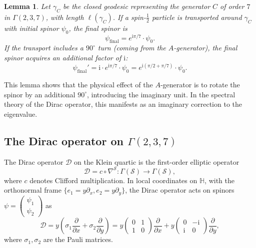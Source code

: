 \documentclass[12pt,a4paper]{article}
\newtheorem{lemma}[theorem]{Lemma}
\theoremstyle{definition}
\theoremstyle{remark}
\newcommand{\HH}{\mathbb{H}}
\newcommand{\cD}{\mathcal{D}}
\newcommand{\cS}{\mathcal{S}}
\newcommand{\ii}{\mathrm{i}}
\begin{document}
\begin{lemma}
\label{lem:transport}
Let $\gamma_C$ be the closed geodesic representing the generator $C$ of order $7$ in $\Gamma(2,3,7)$, with length $\ell(\gamma_C)$. If a spin-$\frac{1}{2}$ particle is transported around $\gamma_C$ with initial spinor $\psi_0$, the final spinor is
\begin{equation}
\psi_{\mathrm{final}} = e^{\ii\pi/7} \cdot \psi_0.
\end{equation}
If the transport includes a $90^\circ$ turn (coming from the $A$-generator), the final spinor acquires an additional factor of $\ii$:
\begin{equation}
\psi_{\mathrm{final}}' = \ii \cdot e^{\ii\pi/7} \cdot \psi_0 = e^{\ii(\pi/2 + \pi/7)} \cdot \psi_0.
\end{equation}
\end{lemma}

This lemma shows that the physical effect of the $A$-generator is to rotate the spinor by an additional $90^\circ$, introducing the imaginary unit. In the spectral theory of the Dirac operator, this manifests as an imaginary correction to the eigenvalue.

\subsection{The Dirac operator on $\Gamma(2,3,7)$}

The Dirac operator $\cD$ on the Klein quartic is the first-order elliptic operator
\begin{equation}
\cD = c \circ \nabla^{\cS} \colon \Gamma(\cS) \to \Gamma(\cS),
\end{equation}
where $c$ denotes Clifford multiplication. In local coordinates on $\HH$, with the orthonormal frame $\{e_1 = y \partial_x, e_2 = y \partial_y\}$, the Dirac operator acts on spinors $\psi = \begin{pmatrix} \psi_1 \\ \psi_2 \end{pmatrix}$ as
\begin{equation}
\cD = y \left( \sigma_1 \frac{\partial}{\partial x} + \sigma_2 \frac{\partial}{\partial y} \right) = y \begin{pmatrix} 0 & 1 \\ 1 & 0 \end{pmatrix} \frac{\partial}{\partial x} + y \begin{pmatrix} 0 & -\ii \\ \ii & 0 \end{pmatrix} \frac{\partial}{\partial y},
\end{equation}
where $\sigma_1, \sigma_2$ are the Pauli matrices.
\end{document}

